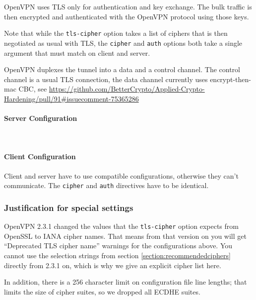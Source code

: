 OpenVPN uses TLS only for authentication and key exchange. The
bulk traffic is then encrypted and authenticated with the OpenVPN
protocol using those keys.

Note that while the \verb|tls-cipher| option takes a list of ciphers
that is then negotiated as usual with TLS, the \verb|cipher|
and \verb|auth| options both take a single argument that must match on
client and server.

OpenVPN duplexes the tunnel into a data and a control channel. The control
channel is a usual TLS connection, the data channel currently uses 
encrypt-then-mac CBC, see \url{https://github.com/BetterCrypto/Applied-Crypto-Hardening/pull/91#issuecomment-75365286}


\paragraph{Server Configuration}
~\\

\paragraph{Client Configuration}
Client and server have to use compatible configurations, otherwise they can't communicate.
The \verb|cipher| and \verb|auth| directives have to be identical.


\subsubsection{Justification for special settings}
OpenVPN 2.3.1 changed the values that the \verb|tls-cipher| option
expects from OpenSSL to IANA cipher names. That means from that
version on you will get ``Deprecated TLS cipher name'' warnings for
the configurations above. You cannot use the selection strings from
section \ref{section:recommendedciphers} directly from 2.3.1 on, which
is why we give an explicit cipher list here.

In addition, there is a 256 character limit on configuration file line
lengths; that limits the size of cipher suites, so we dropped all
ECDHE suites.

